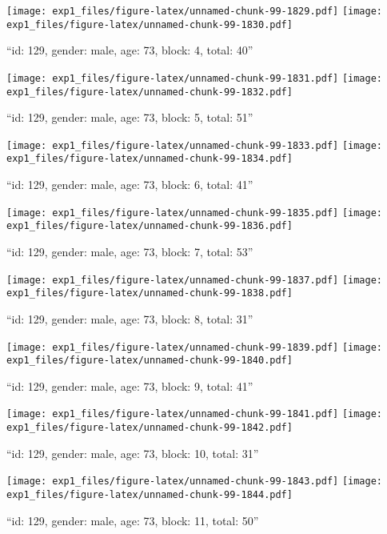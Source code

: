 \documentclass[,]{article}
\begin{document}
\texttt{[image: exp1\_files/figure-latex/unnamed-chunk-99-1829.pdf]}
\texttt{[image: exp1\_files/figure-latex/unnamed-chunk-99-1830.pdf]}

\newpage
[1] 

``id: 129, gender: male, age: 73, block: 4, total: 40''

\texttt{[image: exp1\_files/figure-latex/unnamed-chunk-99-1831.pdf]}
\texttt{[image: exp1\_files/figure-latex/unnamed-chunk-99-1832.pdf]}

\newpage
[1] 

``id: 129, gender: male, age: 73, block: 5, total: 51''

\texttt{[image: exp1\_files/figure-latex/unnamed-chunk-99-1833.pdf]}
\texttt{[image: exp1\_files/figure-latex/unnamed-chunk-99-1834.pdf]}

\newpage
[1] 

``id: 129, gender: male, age: 73, block: 6, total: 41''

\texttt{[image: exp1\_files/figure-latex/unnamed-chunk-99-1835.pdf]}
\texttt{[image: exp1\_files/figure-latex/unnamed-chunk-99-1836.pdf]}

\newpage
[1] 

``id: 129, gender: male, age: 73, block: 7, total: 53''

\texttt{[image: exp1\_files/figure-latex/unnamed-chunk-99-1837.pdf]}
\texttt{[image: exp1\_files/figure-latex/unnamed-chunk-99-1838.pdf]}

\newpage
[1] 

``id: 129, gender: male, age: 73, block: 8, total: 31''

\texttt{[image: exp1\_files/figure-latex/unnamed-chunk-99-1839.pdf]}
\texttt{[image: exp1\_files/figure-latex/unnamed-chunk-99-1840.pdf]}

\newpage
[1] 

``id: 129, gender: male, age: 73, block: 9, total: 41''

\texttt{[image: exp1\_files/figure-latex/unnamed-chunk-99-1841.pdf]}
\texttt{[image: exp1\_files/figure-latex/unnamed-chunk-99-1842.pdf]}

\newpage
[1] 

``id: 129, gender: male, age: 73, block: 10, total: 31''

\texttt{[image: exp1\_files/figure-latex/unnamed-chunk-99-1843.pdf]}
\texttt{[image: exp1\_files/figure-latex/unnamed-chunk-99-1844.pdf]}

\newpage
[1] 

``id: 129, gender: male, age: 73, block: 11, total: 50''
\end{document}
